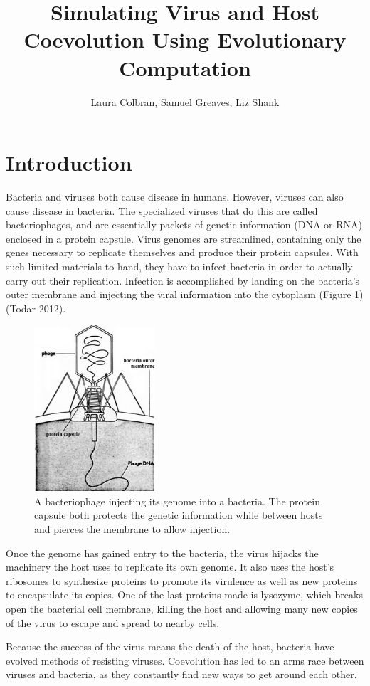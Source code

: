 \documentclass[11pt, oneside]{article}
\title{Simulating Virus and Host Coevolution Using Evolutionary Computation}
\author{Laura Colbran, Samuel Greaves, Liz Shank}
\date{}
\begin{document}
\maketitle
\section{Introduction}
Bacteria and viruses both cause disease in humans. However, viruses can also cause disease in bacteria. The specialized viruses that do this are called bacteriophages, and are essentially packets of genetic information (DNA or RNA) enclosed in a protein capsule. Virus genomes are streamlined, containing only the genes necessary to replicate themselves and produce their protein capsules. With such limited materials to hand, they have to infect bacteria in order to actually carry out their replication. Infection is accomplished by landing on the bacteria's outer membrane and injecting the viral information into the cytoplasm (Figure 1) (Todar 2012).
\begin{figure}[H]
	\centering
	\includegraphics[width=0.4\textwidth]{figure1.png}
	\caption{A bacteriophage injecting its genome into a bacteria. The protein capsule both protects the 		genetic information while between hosts and pierces the membrane to allow injection.}
\end{figure}
Once the genome has gained entry to the bacteria, the virus hijacks the machinery the host uses to replicate its own genome. It also uses the host's ribosomes to synthesize proteins to promote its virulence as well as new proteins to encapsulate its copies. One of the last proteins made is lysozyme, which breaks open the bacterial cell membrane, killing the host and allowing many new copies of the virus to escape and spread to nearby cells.

Because the success of the virus means the death of the host, bacteria have evolved methods of resisting viruses. Coevolution has led to an arms race between viruses and bacteria, as they constantly find new ways to get around each other.
\end{document}
